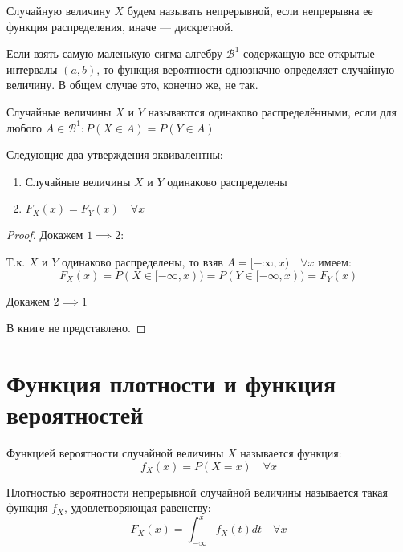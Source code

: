 \documentclass[document]{subfiles}
\begin{document}
\begin{definition}
    Случайную величину $X$ будем называть непрерывной, если непрерывна ее функция распределения, иначе --- дискретной.
\end{definition}

Если взять самую маленькую сигма-алгебру $\mathcal{B}^1$ содержащую все открытые интервалы $(a,b)$, то функция вероятности однозначно определяет случайную величину. В общем случае это, конечно же, не так.

\begin{definition}
    Случайные величины $X$ и $Y$ называются одинаково распределёнными, если для любого $A \in \mathcal{B}^1: P(X \in A) = P(Y \in A)$
\end{definition}

\begin{theorem}
    Следующие два утверждения эквивалентны:
    \begin{enumerate}
        \item Случайные величины $X$ и $Y$ одинаково распределены
        \item $F_X(x) = F_Y(x) \quad \forall x$
    \end{enumerate}
\end{theorem}
\begin{proof}
    Докажем $1 \implies 2$:

    Т.к. $X$ и $Y$ одинаково распределены, то взяв $A = [-\infty, x) \quad \forall x$ имеем:
    \[F_X(x) = P(X \in [-\infty, x)) = P(Y \in [-\infty, x)) = F_Y(x)\]
    
    Докажем $2 \implies 1$

    В книге не представлено.
\end{proof}

\section{Функция плотности и функция вероятностей}

\begin{definition}
    Функцией вероятности случайной величины $X$ называется функция:
    \[f_X(x) = P(X = x) \quad \forall x\]
\end{definition}

\begin{definition}
    Плотностью вероятности непрерывной случайной величины называется такая функция $f_X$, удовлетворяющая равенству:
    \[F_X(x) = \int_{-\infty}^x f_X(t)dt \quad \forall x\]
\end{definition}
\end{document}
